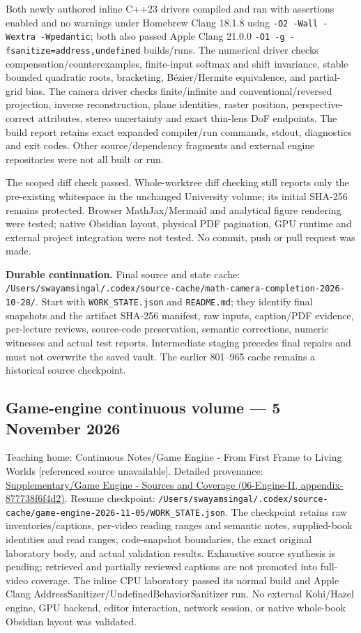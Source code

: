 Both newly authored inline C++23 drivers compiled and ran with assertions enabled and no warnings under Homebrew Clang 18.1.8 using \texttt{-O2\ -Wall\ -Wextra\ -Wpedantic}; both also passed Apple Clang 21.0.0 \texttt{-O1\ -g\ -fsanitize=address,undefined} builds/runs. The numerical driver checks compensation/counterexamples, finite-input softmax and shift invariance, stable bounded quadratic roots, bracketing, Bézier/Hermite equivalence, and partial-grid bias. The camera driver checks finite/infinite and conventional/reversed projection, inverse reconstruction, plane identities, raster position, perspective-correct attributes, stereo uncertainty and exact thin-lens DoF endpoints. The build report retains exact expanded compiler/run commands, stdout, diagnostics and exit codes. Other source/dependency fragments and external engine repositories were not all built or run.

The scoped diff check passed. Whole-worktree diff checking still reports only the pre-existing whitespace in the unchanged University volume; its initial SHA-256 remains protected. Browser MathJax/Mermaid and analytical figure rendering were tested; native Obsidian layout, physical PDF pagination, GPU runtime and external project integration were not tested. No commit, push or pull request was made.

\textbf{Durable continuation.} Final source and state cache: \texttt{/Users/swayamsingal/.codex/source-cache/math-camera-completion-2026-10-28/}. Start with \texttt{WORK\_STATE.json} and \texttt{README.md}; they identify final snapshots and the artifact SHA-256 manifest, raw inputs, caption/PDF evidence, per-lecture reviews, source-code preservation, semantic corrections, numeric witnesses and actual test reports. Intermediate staging precedes final repairs and must not overwrite the saved vault. The earlier 801--965 cache remains a historical source checkpoint.

\subsection{Game-engine continuous volume --- 5 November 2026}\label{appendix-a103e7846d21-game-engine-continuous-volume-5-november-2026}

Teaching home: {Continuous Notes/Game Engine - From First Frame to Living Worlds {[}referenced source unavailable{]}}. Detailed provenance: \href{../06-Engine-II/main.pdf\#nameddest=appendix-877738f6f4d2}{Supplementary/Game Engine - Sources and Coverage (06-Engine-II, appendix-877738f6f4d2)}. Resume checkpoint: \texttt{/Users/swayamsingal/.codex/source-cache/game-engine-2026-11-05/WORK\_STATE.json}. The checkpoint retains raw inventories/captions, per-video reading ranges and semantic notes, supplied-book identities and read ranges, code-snapshot boundaries, the exact original laboratory body, and actual validation results. Exhaustive source synthesis is pending; retrieved and partially reviewed captions are not promoted into full-video coverage. The inline CPU laboratory passed its normal build and Apple Clang AddressSanitizer/UndefinedBehaviorSanitizer run. No external Kohi/Hazel engine, GPU backend, editor interaction, network session, or native whole-book Obsidian layout was validated.

